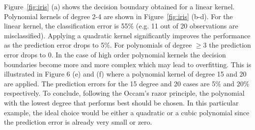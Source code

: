 \documentclass[conference,compsoc]{IEEEtran}
\begin{document}
Figure~\ref{fig:iris} (a) shows the decision boundary obtained for a linear kernel. Polynomial kernels of degree 2-4 are shown in Figure~\ref{fig:iris} (b-d). For the linear kernel, the classification error is 55\% (e.g. 11 out of 20 observations are misclassified). Applying a quadratic kernel significantly improves the performance as the prediction error drops to 5\%. For polynomials of degree $\geq 3$ the prediction error drops to 0. In the case of high order polynomial kernels the decision boundaries become more and more complex which may lead to overfitting. This is illustrated in Figure 6 (e) and (f) where a polynomial kernel of degree 15 and 20 are applied. The prediction errors for the 15 degree and 20 cases are 5\% and 20\% respectively. To conclude, following the Occam’s razor principle, the polynomial with the lowest degree that performs best should be chosen. In this particular example, the ideal choice would be either a quadratic or a cubic polynomial since the prediction error is already very small or zero.
\end{document}
